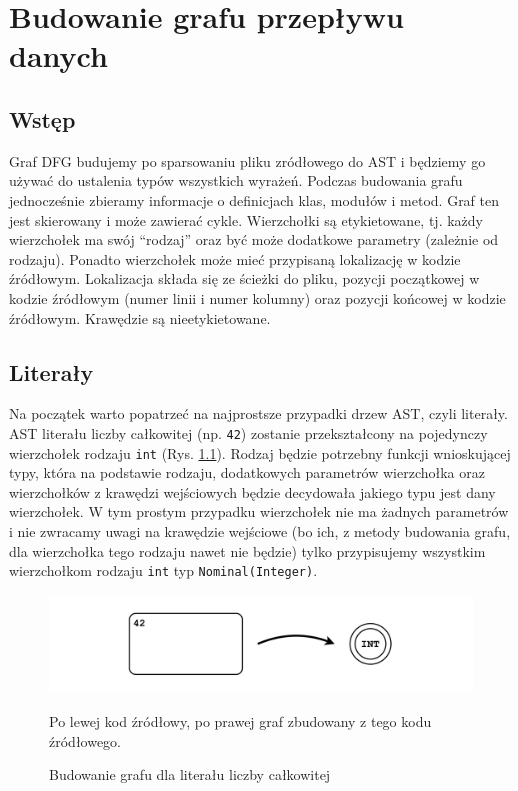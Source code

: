 \documentclass[shortabstract,mgr]{iithesis}
\begin{document}
\chapter{Budowanie grafu przepływu danych}


\section{Wstęp}


Graf DFG budujemy po sparsowaniu pliku zródłowego do AST i będziemy go używać do ustalenia typów wszystkich wyrażeń.
Podczas budowania grafu jednocześnie zbieramy informacje o definicjach klas, modułów i metod.
Graf ten jest skierowany i może zawierać cykle. Wierzchołki są etykietowane, tj. każdy wierzchołek ma swój ``rodzaj'' oraz być może dodatkowe parametry (zależnie od rodzaju). Ponadto wierzchołek może mieć przypisaną lokalizację w kodzie źródłowym. Lokalizacja składa się ze ścieżki do pliku, pozycji początkowej w kodzie źródłowym (numer linii i numer kolumny) oraz pozycji końcowej w kodzie źródłowym. Krawędzie są nieetykietowane.

\section{Literały}

Na początek warto popatrzeć na najprostsze przypadki drzew AST, czyli literały. AST literału liczby całkowitej (np. \texttt{42}) zostanie przekształcony na pojedynczy wierzchołek rodzaju \texttt{int} (Rys. \ref{fig:graph-int}). Rodzaj będzie potrzebny funkcji wnioskującej typy, która na podstawie rodzaju, dodatkowych parametrów wierzchołka oraz wierzchołków z krawędzi wejściowych będzie decydowała jakiego typu jest dany wierzchołek. W tym prostym przypadku wierzchołek nie ma żadnych parametrów i nie zwracamy uwagi na krawędzie wejściowe (bo ich, z metody budowania grafu, dla wierzchołka tego rodzaju nawet nie będzie) tylko przypisujemy wszystkim wierzchołkom rodzaju \texttt{int} typ \texttt{Nominal(Integer)}.

\begin{figure}[htb]
	\centering
	\includegraphics[scale=0.4]{imgs/msc-int.png}
	\caption{Budowanie grafu dla literału liczby całkowitej}
        Po lewej kod źródłowy, po prawej graf zbudowany z tego kodu źródłowego.
	\label{fig:graph-int}
\end{figure}
\end{document}
